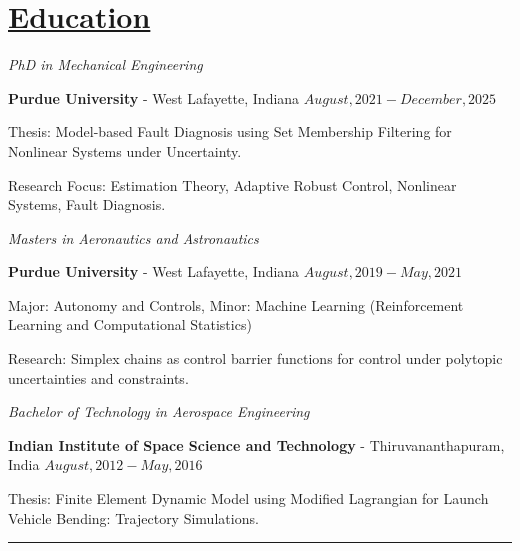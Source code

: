 \section*{\underline{Education}}

\noindent \textit{PhD in Mechanical Engineering}

\textbf{Purdue University} - West Lafayette, Indiana \hfill $August, 2021 - December, 2025$

Thesis: Model-based Fault Diagnosis using Set Membership Filtering for Nonlinear Systems under Uncertainty.

Research Focus: Estimation Theory, Adaptive Robust Control, Nonlinear Systems, Fault Diagnosis.

\medskip

\noindent \textit{Masters in Aeronautics and Astronautics}

\textbf{Purdue University} - West Lafayette, Indiana \hfill $August, 2019 - May, 2021$

Major: Autonomy and Controls, Minor: Machine Learning (Reinforcement Learning and Computational Statistics)

Research: Simplex chains as control barrier functions for control under polytopic uncertainties and constraints.

\medskip

\noindent \textit{Bachelor of Technology in Aerospace Engineering }

\textbf{Indian Institute of Space Science and Technology} - Thiruvananthapuram, India \hfill $ August, 2012 - May, 2016 $

Thesis: Finite Element Dynamic Model using Modified Lagrangian for Launch Vehicle Bending: Trajectory Simulations.

\noindent\rule{\textwidth}{0.4pt}
